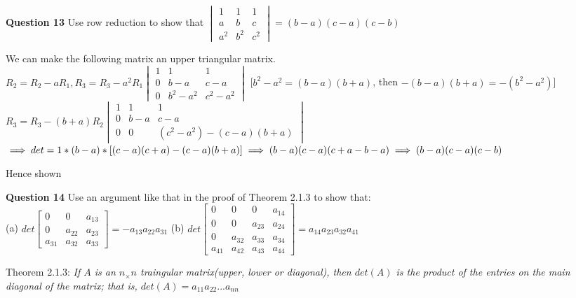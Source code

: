 \documentclass[addpoints]{exam}
\begin{document}
\begin{sloppypar}
\begin{questions}
    \question
    \textbf{Question 13} Use row reduction to show that $\begin{vmatrix}
        1 & 1 & 1 \\ a & b & c \\ a^2 & b^2 & c^2
    \end{vmatrix} = (b - a)(c - a)(c - b)$
    \begin{solution}
        We can make the following matrix an upper triangular matrix. \\ 
        $ R_2 = R_2 - aR_1, R_3 = R_3 - a^2R_1 \begin{vmatrix}
            1 & 1 & 1 \\ 0 & b-a & c-a \\ 0 & b^2 - a^2 & c^2 - a^2
        \end{vmatrix}$ [$ b^2 - a^2 = (b-a)(b+a) $, then $ -(b-a)(b+a) = -(b^2 - a^2) $] \\ 
        $ R_3 = R_3 -(b+a)R_2 \begin{vmatrix}
            1 & 1 & 1 \\ 0 & b-a & c - a \\ 0 & 0 & (c^2 - a^2) - (c-a)(b+a)
        \end{vmatrix} $ \\ 
        $ \implies det = 1 * (b - a) * [(c-a)(c+a) - (c-a)(b+a)] \implies (b-a)(c-a)(c + a - b - a) \\ \implies 
        (b - a)(c - a)(c - b)
        $

        Hence shown
    \end{solution}

    \question
    \textbf{Question 14} Use an argument like that in the proof of Theorem 2.1.3 to show that: \\ 
    (a) $det\begin{bmatrix}
        0 & 0 & a_{13} \\ 0 & a_{22} & a_{23} \\ a_{31} & a_{32} & a_{33}
    \end{bmatrix} = -a_{13}a_{22}a_{31}$ \hspace*{5mm} (b) $det\begin{bmatrix}
        0 & 0 & 0 & a_{14} \\ 0 & 0 & a_{23} & a_{24} \\ 0 & a_{32} & a_{33} & a_{34} \\ a_{41} & a_{42} & a_{43} & a_{44}
    \end{bmatrix} = a_{14}a_{23}a_{32}a_{41}$
    \begin{solution}
        Theorem 2.1.3: \textit{If $A$ is an $n_\times n$ traingular matrix(upper, lower or diagonal), then $det(A)$ is the product of the entries on the main diagonal of the matrix; that is, $det(A) = a_{11}a_{22}...a_{nn}$ }


\end{solution}
\end{questions}
\end{sloppypar}
\end{document}
